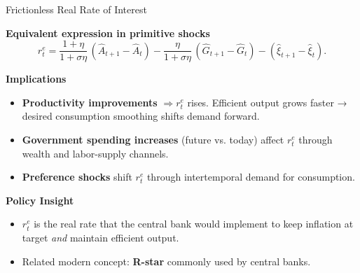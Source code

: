 \documentclass[11pt,aspectratio=169]{beamer}
\begin{document}
\begin{frame}{Frictionless Real Rate of Interest}
\small

\textbf{Equivalent expression in primitive shocks}
\begin{equation}
r_t^{e}
=
\frac{1+\eta}{1+\sigma\eta}\,(\hat{A}_{t+1}-\hat{A}_t)
-
\frac{\eta}{1+\sigma\eta}\,(\hat{G}_{t+1}-\hat{G}_t)
-
(\hat{\xi}_{t+1}-\hat{\xi}_t).
\label{efficientr}
\end{equation}

\textbf{Implications}
\begin{itemize}
    \item \textbf{Productivity improvements} $\Rightarrow r_t^{e}$ rises.  
          Efficient output grows faster → desired consumption smoothing shifts demand forward.

    \item \textbf{Government spending increases} (future vs. today)  
          affect $r_t^{e}$ through wealth and labor-supply channels.

    \item \textbf{Preference shocks} shift $r_t^{e}$ through intertemporal demand for consumption.
\end{itemize}

\vspace{0.2cm}

\textbf{Policy Insight}
\begin{itemize}
    \item $r_t^{e}$ is the real rate that the central bank would implement  
          to keep inflation at target \emph{and} maintain efficient output.
    \item Related modern concept: \textbf{R-star} commonly used by central banks.
\end{itemize}

\end{frame}


\end{document}
